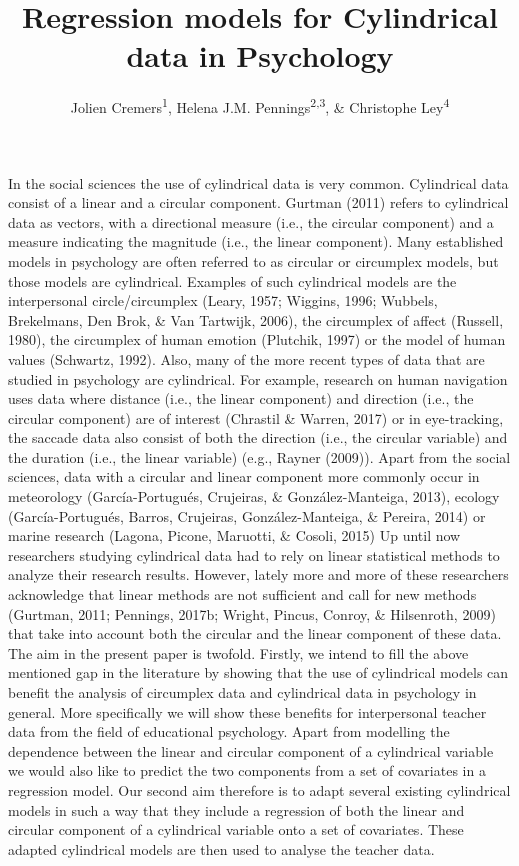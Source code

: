 \documentclass[man,mask]{apa6}
\title{Regression models for Cylindrical data in Psychology}
\author{Jolien Cremers\textsuperscript{1}, Helena J.M. Pennings\textsuperscript{2,3}, \& Christophe Ley\textsuperscript{4}}
\date{}
\affiliation{
\vspace{0.5cm}
\textsuperscript{1} Department of Biostatistics, University of Copenhagen\\\textsuperscript{2} TNO\\\textsuperscript{3} Department of Education, Utrecht University\\\textsuperscript{4} Department of Applied Mathematics, Computer Science and Statistics, Ghent University}
\DeclareRobustCommand{\VAN}[3]{#2}
\DeclareRobustCommand{\DEN}[3]{#2}
\begin{document}
\maketitle

In the social sciences the use of cylindrical data is very common. Cylindrical
data consist of a linear and a circular component. Gurtman (2011) refers
to cylindrical data as vectors, with a directional measure (i.e., the circular
component) and a measure indicating the magnitude (i.e., the linear component).
Many established models in psychology are often referred to as circular or
circumplex models, but those models are cylindrical. Examples of such
cylindrical models are the interpersonal circle/circumplex
(Leary, 1957; Wiggins, 1996; Wubbels, Brekelmans, \DEN{Brok}{Den}{den} Brok, \& \VAN{Tartwijk}{Van}{van} Tartwijk, 2006), the circumplex of
affect (Russell, 1980), the circumplex of human emotion
(Plutchik, 1997) or the model of human values (Schwartz, 1992).
\newline
\indent Also, many of the more recent types of data that are studied in
psychology are cylindrical. For example, research on human navigation uses data
where distance (i.e., the linear component) and direction (i.e., the circular
component) are of interest (Chrastil \& Warren, 2017) or in eye-tracking, the
saccade data also consist of both the direction (i.e., the circular variable)
and the duration (i.e., the linear variable) (e.g., Rayner (2009)). Apart from
the social sciences, data with a circular and linear component more commonly
occur in meteorology (García-Portugués, Crujeiras, \& González-Manteiga, 2013), ecology (García-Portugués, Barros, Crujeiras, González-Manteiga, \& Pereira, 2014) or marine
research (Lagona, Picone, Maruotti, \& Cosoli, 2015) \newline
\indent Up until now researchers studying cylindrical data had to rely on linear
statistical methods to analyze their research results. However, lately more and
more of these researchers acknowledge that linear methods are not sufficient and
call for new methods (Gurtman, 2011; Pennings, 2017b; Wright, Pincus, Conroy, \& Hilsenroth, 2009) that take into account both the circular and the linear
component of these data.
\newline
\indent The aim in the present paper is twofold. Firstly, we intend to fill the
above mentioned gap in the literature by showing that the use of cylindrical
models can benefit the analysis of circumplex data and cylindrical data in
psychology in general. More specifically we will show these benefits for
interpersonal teacher data from the field of educational psychology. Apart from
modelling the dependence between the linear and circular component of a
cylindrical variable we would also like to predict the two components from a set
of covariates in a regression model. Our second aim therefore is to adapt
several existing cylindrical models in such a way that they include a regression
of both the linear and circular component of a cylindrical variable onto a set
of covariates. These adapted cylindrical models are then used to analyse the
teacher data.
\end{document}
